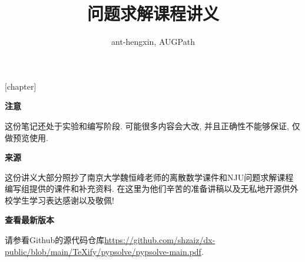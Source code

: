 \usepackage[lastexercise,answerdelayed]{exercise}
[chapter]
\newcommand{\QuestionNB}{\bfseries\arabic{Question}.\ }
\renewcommand{\ExerciseName}{练习题}
\renewcommand{\ExerciseHeader}{\noindent\def\stackalignment{l}%
    \stackunder[0pt]{\colorbox{cyan}{\textcolor{white}{\textbf{\large\ExerciseName\;\LARGE\ExerciseHeaderNB}}}}{\textcolor{lightcyan}{\rule{\linewidth}{2pt}}}\medskip}
\renewcommand{\AnswerName}{Exercises}
\renewcommand{\AnswerHeader}{\ifthenelse{\boolean{firstanswerofthechapter}}%
    {\bigskip\noindent\textcolor{cyan}{\textbf{CHAPTER \thechapter}}\newline\newline%
        \noindent\bfseries\emph{\textcolor{cyan}{\AnswerName\ \ExerciseHeaderNB, page %
                \pageref{\AnswerRef}}}\smallskip}
    {\noindent\bfseries\emph{\textcolor{cyan}{\AnswerName\ \ExerciseHeaderNB, page \pageref{\AnswerRef}}}\smallskip}}
\setlength{\QuestionIndent}{16pt}




\title{问题求解课程讲义}
\author{ant-hengxin, AUGPath}
\maketitle
\begin{center}
{\bf \large 注意}
\end{center}
这份笔记还处于实验和编写阶段. 可能很多内容会大改, 并且正确性不能够保证, 仅做预览使用. 


\begin{center}
{\bf \large 来源}
\end{center}

这份讲义大部分照抄了南京大学魏恒峰老师的离散数学课件和NJU问题求解课程编写组提供的课件和补充资料. 在这里为他们辛苦的准备讲稿以及无私地开源供外校学生学习表达感谢以及敬佩!

\begin{center}
{\bf \large 查看最新版本}
\end{center}  

请参看Github的源代码仓库\url{https://github.com/shzaiz/dx-public/blob/main/TeXify/pypsolve/pypsolve-main.pdf}. 
\tableofcontents

